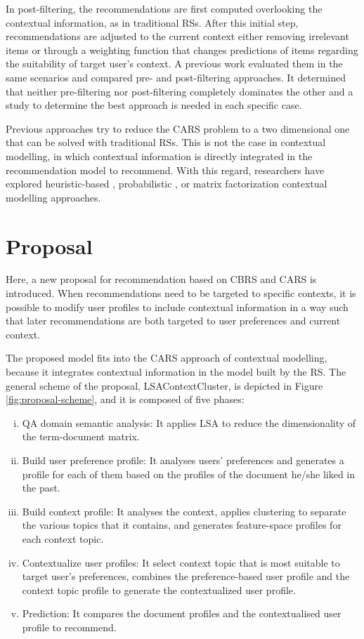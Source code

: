 \documentclass[preprint]{elsarticle}
\begin{document}
\begin{spacing}{1.5}
In post-filtering, the recommendations are first computed overlooking the contextual information, as in traditional RSs. After this initial step, recommendations are adjusted to the current context either removing irrelevant items or through a weighting function that changes predictions of items regarding the suitability of target user's context. A previous work \cite{Panniello2009} evaluated them in the same scenarios and compared pre- and post-filtering approaches. It determined that neither pre-filtering nor post-filtering completely dominates the other and a study to determine the best approach is needed in each specific case.

Previous approaches try to reduce the CARS problem to a two dimensional one that can be solved with traditional RSs. This is not the case in contextual modelling, in which contextual information is directly integrated in the recommendation model to recommend. With this regard, researchers have explored heuristic-based \cite{Panniello2014}, probabilistic \cite{Adomavicius2005b}, or matrix factorization \cite{Baltrunas2011c} contextual modelling approaches.

\section{Proposal}
\label{sec:proposal}

Here, a new proposal for recommendation based on CBRS and CARS is introduced. When recommendations need to be targeted to specific contexts, it is possible to modify user profiles to include contextual information in a way such that later recommendations are both targeted to user preferences and current context.

The proposed model fits into the CARS approach of contextual modelling, because it integrates contextual information in the model built by the RS. The general scheme of the proposal, LSAContextCluster, is depicted in Figure \ref{fig:proposal-scheme}, and it is composed of five phases:
\begin{enumerate}[(i)]
	\item QA domain semantic analysis: It applies LSA to reduce the dimensionality of the term-document matrix.
	\item Build user preference profile: It analyses users' preferences and generates a profile for each of them based on the profiles of the document he/she liked in the past.
	\item Build context profile: It analyses the context, applies clustering to separate the various topics that it contains, and generates feature-space profiles for each context topic.
	\item Contextualize user profiles: It select context topic that is most suitable to target user's preferences, combines the preference-based user profile and the context topic profile to generate the contextualized user profile.
	\item Prediction: It compares the document profiles and the contextualised user profile to recommend.
\end{enumerate}


\end{spacing}
\end{document}
